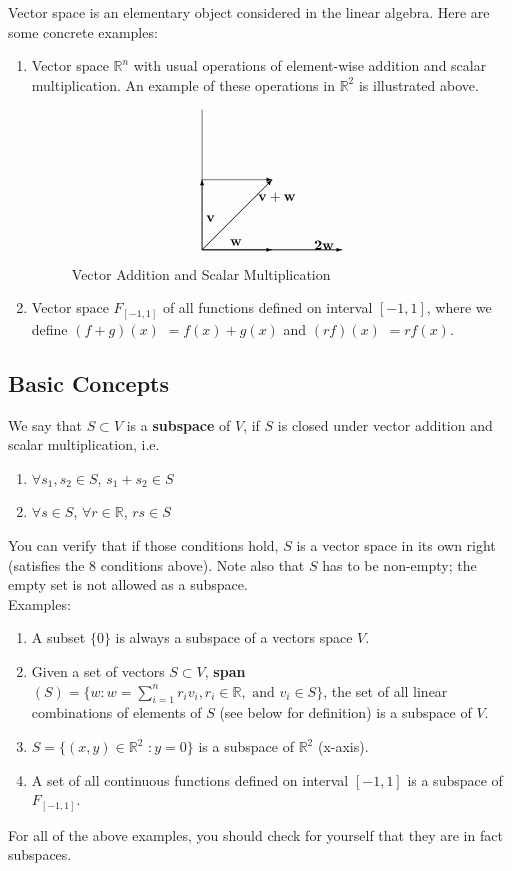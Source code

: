 \documentclass[12pt,oneside]{article}
\begin{document}
Vector space is an elementary object considered in the linear algebra. Here are some concrete examples:
\begin{enumerate}
\item Vector space ${\mathbb{R}}^{n}$ with usual operations of
  element-wise addition and scalar multiplication. An example of these
  operations in $\mathbb{R}^2$ is illustrated above.
\begin{figure}

\[
\setlength{\unitlength}{10pt}
\begin{picture}(10,10)
\put(0,0){\line(1,0){10}}
\put(0,0){\line(0,1){10}}
\put(0,0){\vector(0,1){5}}
\put(0,0){\vector(1,0){5}}
\put(0.3,2){$\bf v$}
\put(2,0.3){${\bf w}$}
\put(0,5){\vector(1,0){5}}
\put(0,0){\vector(1,1){5}}
\put(4,3.5){$\bf v + w$}
\put(0,0){\vector(1,0){10}}
\put(8, 0){$\bf 2w$}
\end{picture}
\]
\caption{Vector Addition and Scalar Multiplication}\label{span1}
\end{figure}

\item Vector space $F_{[-1,1]}$ of all functions defined on interval
  $[-1, 1]$, where we define $(f + g) (x)$ $= f(x) + g(x)$ and $(r f)
  (x)$ $= r f(x)$.
\end{enumerate}


\subsection{Basic Concepts}
We say that $S \subset V$ is a \textbf{subspace} of $V$, if $S$ is
closed under vector addition and scalar multiplication, i.e.
\begin{enumerate}
\item $\forall s_{1}, s_{2} \in S$, $s_{1} + s_{2} \in S$
\item $\forall s \in S$, $\forall r \in \mathbb{R}$, $r s \in S$
\end{enumerate}
You can verify that if those conditions hold, $S$ is a vector space in
its own right (satisfies the 8 conditions above). Note also that $S$
has to be non-empty; the empty set is not allowed as a subspace.\\

\noindent Examples:
\begin{enumerate}
\item A subset $\{0\}$ is always a subspace of a vectors space $V$.
\item Given a set of vectors $ S \subset V$, \textbf{span}\((S)=\{w : w=\sum_{i=1}^n r_iv_i, r_i \in \mathbb{R}, \text{ and } v_i \in S\} \), the set of
  all linear combinations of elements of \(S\) (see below for definition) is a
  subspace of $V$.
\item $S = \{(x,y) \in {\mathbb{R}}^{2}$ $: y = 0 \}$ is a subspace of
  ${\mathbb{R}}^{2}$ (x-axis).
\item A set of all continuous functions defined on interval $[-1, 1]$
  is a subspace of $F_{[-1, 1]}$.

\end{enumerate}
For all of the above examples, you should check for yourself that they
are in fact subspaces. \\
\end{document}

